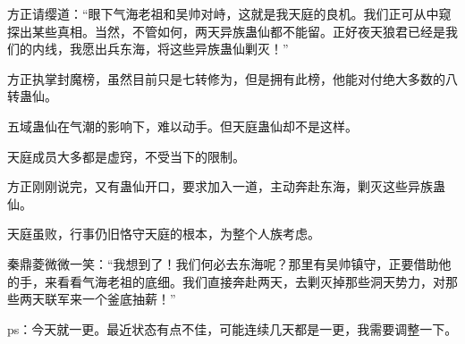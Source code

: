 \begin{this_body}
方正请缨道：“眼下气海老祖和吴帅对峙，这就是我天庭的良机。我们正可从中窥探出某些真相。当然，不管如何，两天异族蛊仙都不能留。正好夜天狼君已经是我们的内线，我愿出兵东海，将这些异族蛊仙剿灭！”

方正执掌封魔榜，虽然目前只是七转修为，但是拥有此榜，他能对付绝大多数的八转蛊仙。

五域蛊仙在气潮的影响下，难以动手。但天庭蛊仙却不是这样。

天庭成员大多都是虚窍，不受当下的限制。

方正刚刚说完，又有蛊仙开口，要求加入一道，主动奔赴东海，剿灭这些异族蛊仙。

天庭虽败，行事仍旧恪守天庭的根本，为整个人族考虑。

秦鼎菱微微一笑：“我想到了！我们何必去东海呢？那里有吴帅镇守，正要借助他的手，来看看气海老祖的底细。我们直接奔赴两天，去剿灭掉那些洞天势力，对那些两天联军来一个釜底抽薪！”

ps：今天就一更。最近状态有点不佳，可能连续几天都是一更，我需要调整一下。

\end{this_body}

